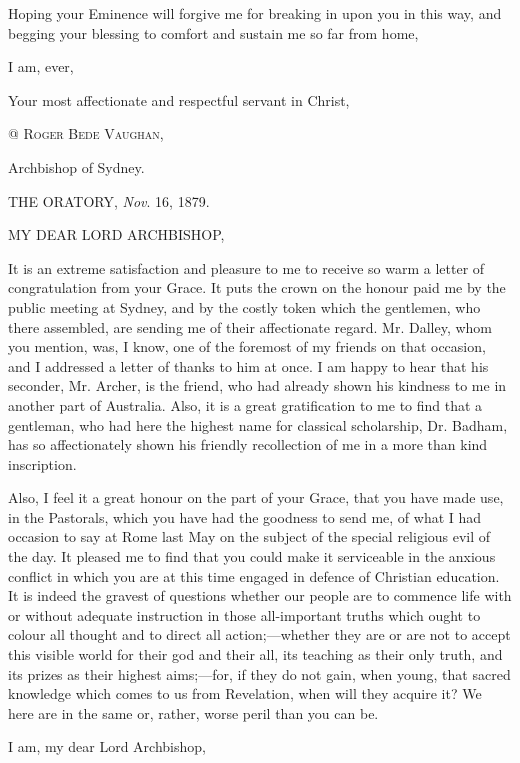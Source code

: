 Hoping your Eminence will forgive me for breaking in upon you in
this way, and begging your blessing to comfort and sustain me so far
from home,

I am, ever,

Your most affectionate and respectful servant in Christ,

@ R\textsc{oger} B\textsc{ede}
V\textsc{aughan},

Archbishop of Sydney.


THE ORATORY, \emph{Nov}.
16, 1879.

MY DEAR LORD
ARCHBISHOP,

It is an extreme satisfaction and pleasure to me to receive so warm a
letter of congratulation from your Grace. It puts the crown on the
honour paid me by the public meeting at Sydney, and by the
costly token which the gentlemen, who there assembled, are sending me
of their affectionate regard. Mr. Dalley, whom you mention, was, I
know, one of the foremost of my friends on that occasion, and I
addressed a letter of thanks to him at once. I am happy to hear that
his seconder, Mr. Archer, is the friend, who had already shown his
kindness to me in another part of Australia. Also, it is a great
gratification to me to find that a gentleman, who had here the highest
name for classical scholarship, Dr. Badham, has so affectionately
shown his friendly recollection of me in a more than kind inscription.

Also, I feel it a great honour on the part of your Grace, that you
have made use, in the Pastorals, which you have had the goodness to
send me, of what I had occasion to say at Rome last May on the subject
of the special religious evil of the day. It pleased me to find that
you could make it serviceable in the anxious conflict in which you are
at this time engaged in defence of Christian education. It is indeed
the gravest of questions whether our people are to commence life with
or without adequate instruction in those all-important truths which
ought to colour all thought and to direct all action;—whether they
are or are not to accept this visible world for their god and their
all, its teaching as their only truth, and its prizes as their highest
aims;—for, if they do not gain, when young, that sacred knowledge
which comes to us from Revelation, when will they acquire it? We here
are in the same or, rather, worse peril than you can be.

I am, my dear Lord Archbishop,

